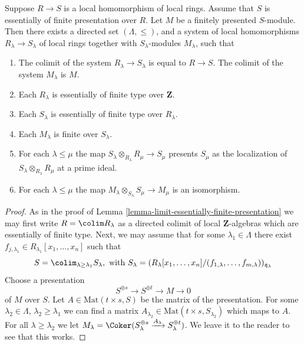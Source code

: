 \begin{lemma}
\label{lemma-limit-module-essentially-finite-presentation}
Suppose $R \to S$ is a local homomorphism of local rings.
Assume that $S$ is essentially of finite presentation over $R$.
Let $M$ be a finitely presented $S$-module.
Then there exists a directed set $(\Lambda, \leq)$, and
a system of local homomorphisms $R_\lambda \to S_\lambda$
of local rings together with $S_\lambda$-modules $M_\lambda$,
such that
\begin{enumerate}
\item The colimit of the system $R_\lambda \to S_\lambda$
is equal to $R \to S$. The colimit of the system $M_\lambda$
is $M$.
\item Each $R_\lambda$ is essentially of finite type
over $\mathbf{Z}$.
\item Each $S_\lambda$ is essentially of finite type
over $R_\lambda$.
\item Each $M_\lambda$ is finite over $S_\lambda$.
\item For each $\lambda \leq \mu$ the map
$S_\lambda \otimes_{R_\lambda} R_\mu \to S_\mu$
presents $S_\mu$ as the localization of
$S_\lambda \otimes_{R_\lambda} R_\mu$
at a prime ideal.
\item For each $\lambda \leq \mu$ the map
$M_\lambda \otimes_{S_\lambda} S_\mu \to M_\mu$
is an isomorphism.
\end{enumerate}
\end{lemma}

\begin{proof}
As in the proof of Lemma \ref{lemma-limit-essentially-finite-presentation}
we may first write $R = \colim R_\lambda$ as a directed colimit
of local $\mathbf{Z}$-algebras which are essentially of finite type.
Next, we may assume that for some $\lambda_1 \in \Lambda$ there
exist $f_{j, \lambda_1} \in R_{\lambda_1}[x_1, \ldots, x_n]$
such that
$$
S =
\colim_{\lambda \geq \lambda_1} S_\lambda, \text{ with }
S_\lambda =
(R_\lambda[x_1, \ldots, x_n]/
(f_{1, \lambda}, \ldots, f_{m, \lambda}))_{\mathfrak q_\lambda}
$$
Choose a presentation
$$
S^{\oplus s} \to S^{\oplus t} \to M \to 0
$$
of $M$ over $S$. Let $A \in \text{Mat}(t \times s, S)$ be
the matrix of the presentation. For some $\lambda_2 \in \Lambda$,
$\lambda_2 \geq \lambda_1$
we can find a matrix $A_{\lambda_2} \in \text{Mat}(t \times s, S_{\lambda_2})$
which maps to $A$. For all $\lambda \geq \lambda_2$ we let
$M_\lambda = \Coker(S_\lambda^{\oplus s} \xrightarrow{A_\lambda}
S_\lambda^{\oplus t})$. We leave it to the reader to see that
this works.
\end{proof}
